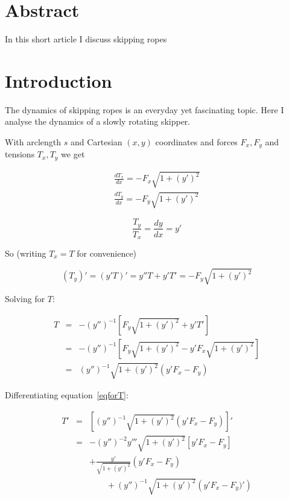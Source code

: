 \documentclass{article}
\begin{document}
\newcommand{\jj}{\sqrt{1+\left(y'\right)^2}}
\section*{Abstract}
In this short article I discuss skipping ropes



\section{Introduction}

The dynamics of skipping ropes is an everyday yet fascinating topic.
Here I analyse the dynamics of a slowly rotating skipper.



\citep{mohazzabi1999}


With arclength $s$ and Cartesian $(x,y)$ coordinates and forces
$F_x,F_y$ and tensions $T_x,T_y$ we get

\begin{eqnarray}
  \frac{dT_x}{dx}=-F_x\jj\label{Tx}\\
  \frac{dT_y}{dx}=-F_y\jj\label{Ty}
  \end{eqnarray}

\begin{equation}
  \frac{T_y}{T_x}=\frac{dy}{dx}=y'
\end{equation}

So (writing $T_x=T$ for convenience)

\begin{equation}
(T_y)'=(y'T)'=y''T+y'T'=-F_y\jj
\end{equation}

Solving for $T$:

\begin{eqnarray}
  T &=& -(y'')^{-1}\left[F_y\jj + y'T'\right]\nonumber\\
  &=& -(y'')^{-1}\left[F_y\jj -y'F_x\jj\right]\nonumber\\
    &=& (y'')^{-1}\jj(y'F_x-F_y)\label{eqforT}
\end{eqnarray}

Differentiating equation~\ref{eqforT}:

\begin{eqnarray}
  T'&=& \left[(y'')^{-1}\jj(y'F_x-F_y)\right]'\nonumber\\
  &=& -(y'')^{-2}y'''\jj\left[y'F_x-F_y\right]\nonumber\\
  &{}& +\frac{y'}{\jj}(y'F_x-F_y)\nonumber\\
  &{}& \quad\quad+(y'')^{-1}\jj\left(y'F_x-F_y)'\right)
\end{eqnarray}
\end{document}
